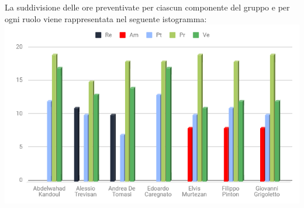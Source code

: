 La suddivisione delle ore preventivate per ciascun componente del gruppo e per ogni ruolo viene rappresentata nel seguente istogramma:\\
\includegraphics[width=1\textwidth]{./src/Preventivo/src/img/IstoSviluppo.png}
\clearpage


